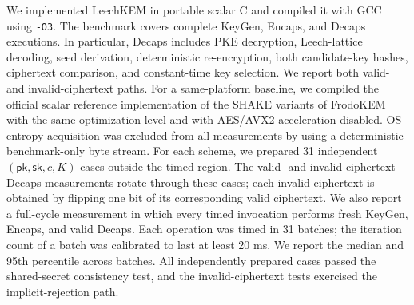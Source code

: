 We implemented LeechKEM in portable scalar C and compiled it with GCC using
\texttt{-O3}.  The benchmark covers complete KeyGen, Encaps, and Decaps
executions.  In particular, Decaps includes PKE decryption, Leech-lattice
decoding, seed derivation, deterministic re-encryption, both candidate-key
hashes, ciphertext comparison, and constant-time key selection.  We report
both valid- and invalid-ciphertext paths.  For a same-platform baseline, we
compiled the official scalar reference implementation of the SHAKE variants
of FrodoKEM with the same optimization level and with AES/AVX2 acceleration
disabled.  OS entropy acquisition was excluded from all measurements by using
a deterministic benchmark-only byte stream.  For each scheme, we prepared 31
independent $(\mathsf{pk},\mathsf{sk},c,K)$ cases outside the timed region.
The valid- and invalid-ciphertext Decaps measurements rotate through these
cases; each invalid ciphertext is obtained by flipping one bit of its
corresponding valid ciphertext.  We also report a full-cycle measurement in
which every timed invocation performs fresh KeyGen, Encaps, and valid Decaps.
Each operation was timed in 31 batches; the iteration count of a batch was
calibrated to last at least 20 ms.  We report the median and 95th percentile
across batches.  All independently prepared cases passed the shared-secret
consistency test, and the invalid-ciphertext tests exercised the
implicit-rejection path.
